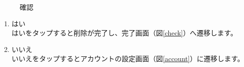 \documentclass[a4j]{jarticle}
\begin{document}
\begin{figure}[H]
    \begin{center}
    \caption {確認}
    \label{delete}
    \end{center}
\end{figure}

\begin{enumerate}
  \renewcommand{\labelenumi}{\textcircled{\scriptsize \theenumi}}
\item はい\\
  はいをタップすると削除が完了し、完了画面（図\ref{check}）へ遷移します。
\item いいえ\\
  いいえをタップするとアカウントの設定画面（図\ref{account}）に遷移します。
\end{enumerate}
\end{document}
